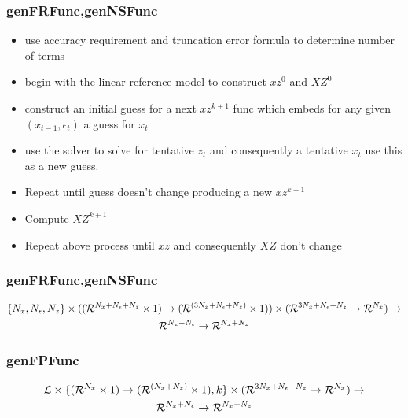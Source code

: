 \documentclass[tikz]{beamer}
\begin{document}
\begin{frame}
\frametitle{genFRFunc,genNSFunc}
\label{sec:genfrfunc}
  \begin{itemize}
  \item use accuracy requirement and truncation error formula to determine number of terms
  \item begin with the linear reference model to construct $xz^0$ and $XZ^0$
  \item construct an initial guess for a next $xz^{k+1}$ func which embeds
for any given $(x_{t-1},\epsilon_t)$ a guess for $x_t$ 
  \item use the solver to solve for tentative $z_t$ and consequently 
a tentative $x_t$ use this as a new guess.  
\item Repeat until guess doesn't change producing  a new $xz^{k+1}$
\item Compute $XZ^{k+1}$
\item Repeat above process until $xz$ and consequently $XZ$ don't change
  \end{itemize}
\end{frame}

\begin{frame}
  
\end{frame}

\begin{frame}
\frametitle{genFRFunc,genNSFunc}
\begin{gather*}
\{{N_x},{N_\epsilon},{N_z}\}\times({({\mathcal{R}^{{N_x}+{N_\epsilon}+{N_z}}}\times 1)\rightarrow ({\mathcal{R}^{({3{N_x}+{N_\epsilon}+{N_z}})}}\times 1)})\times ({{\mathcal{R}^{3{N_x}+{N_\epsilon}+{N_z}}}\rightarrow{\mathcal{R}^{{N_x}}}})    \rightarrow\\
{{\mathcal{R}^{{N_x}+{N_\epsilon}}}\rightarrow{\mathcal{R}^{{N_x}+{N_z}}}}
\end{gather*}
\end{frame}

\begin{frame}
\frametitle{genFPFunc}
\label{sec:genfpfunc}
\begin{gather*}
{\mathcal{L}} \times \{  {({\mathcal{R}^{{N_x}}}\times 1)\rightarrow ({\mathcal{R}^{({{N_x}+{N_z}})}}\times 1)}, k \} \times ({{\mathcal{R}^{3{N_x}+{N_\epsilon}+{N_z}}}\rightarrow{\mathcal{R}^{{N_x}}}})    \rightarrow\\ 
{{\mathcal{R}^{{N_x}+{N_\epsilon}}}\rightarrow{\mathcal{R}^{{N_x}+{N_z}}}}
\end{gather*}

\end{frame}
\end{document}
